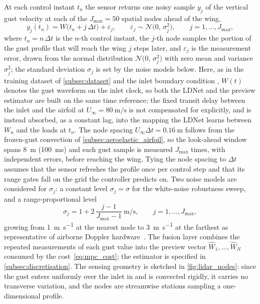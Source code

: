 At each control instant $t_n$ the sensor returns one noisy sample $y_j$ of the vertical gust velocity at each of the $J_{\max} = 50$ spatial nodes ahead of the wing,
\begin{equation}
y_j(t_n) = W\bigl(t_n + j\,\Delta t\bigr) + \varepsilon_j, \qquad
\varepsilon_j \sim \mathcal{N}\bigl(0,\,\sigma_j^2\bigr), \qquad j = 1,\dots,J_{\max},
\label{eq:meas_model}
\end{equation}
where $t_n = n\,\Delta t$ is the $n$-th control instant, the $j$-th node samples the portion of the gust profile that will reach the wing $j$ steps later, and $\varepsilon_j$ is the measurement error, drawn from the normal distribution $\mathcal{N}\bigl(0,\,\sigma_j^2\bigr)$ with zero mean and variance $\sigma_j^2$; the standard deviation $\sigma_j$ is set by the noise models below. Here, as in the training dataset of \cref{subsec:dataset} and the inlet boundary condition , $W(t)$ denotes the gust waveform on the inlet clock, so both the LDNet and the preview estimator are built on the same time reference; the fixed transit delay between the inlet and the airfoil at $U_\infty=\SI{80}{\meter\per\second}$ is not compensated for explicitly, and is instead absorbed, as a constant lag, into the mapping the LDNet learns between $W_n$ and the loads at $t_n$. The node spacing $U_\infty \Delta t = \SI{0.16}{\meter}$ follows from the frozen-gust convection of \cref{subsec:aeroelastic_airfoil}, so the look-ahead window spans \SI{8}{\meter} (\SI{100}{\milli\second}) and each gust sample is measured $J_{\max}$ times, with independent errors, before reaching the wing. Tying the node spacing to $\Delta t$ assumes that the sensor refreshes the profile once per control step and that its range gates fall on the grid the controller predicts on. Two noise models are considered for $\sigma_j$: a constant level $\sigma_j = \sigma$ for the white-noise robustness sweep, and a range-proportional level
\begin{equation}
\sigma_j = 1 + 2\,\frac{j-1}{J_{\max}-1}~\si{\meter\per\second}, \qquad j = 1,\dots,J_{\max},
\label{eq:range_prop_noise}
\end{equation}
growing from \SI{1}{\meter\per\second} at the nearest node to \SI{3}{\meter\per\second} at the farthest as representative of airborne Doppler hardware~\cite{rabadan2010lidar,cavaliere2022estimator}. The fusion layer combines the repeated measurements of each gust value into the preview vector $\widehat{W}_1,\dots,\widehat{W}_N$ consumed by the cost~\eqref{eq:mpc_cost}; the estimator is specified in \cref{subsec:discretisation}. The sensing geometry is sketched in \cref{fig:lidar_nodes}: since the gust enters uniformly over the inlet in  and is convected rigidly, it carries no transverse variation, and the nodes are streamwise stations sampling a one-dimensional profile.

